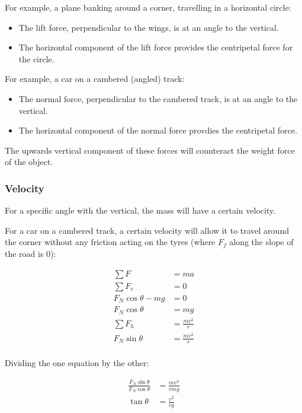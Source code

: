 \documentclass[a4paper,11pt]{article}
\begin{document}
For example, a plane banking around a corner, travelling in a horizontal circle:

\begin{itemize}
\item The lift force, perpendicular to the wings, is at an angle to the
	vertical.
\item The horizontal component of the lift force provides the centripetal force
	for the circle.
\end{itemize}

For example, a car on a cambered (angled) track:

\begin{itemize}
\item The normal force, perpendicular to the cambered track, is at an angle to
	the vertical.
\item The horizontal component of the normal force provdies the centripetal
	force.
\end{itemize}

The upwards vertical component of these forces will counteract the weight force
of the object.


\subsubsection{Velocity}

For a specific angle with the vertical, the mass will have a certain velocity.

For a car on a cambered track, a certain velocity will allow it to travel
around the corner without any friction acting on the tyres (where $F_f$ along
the slope of the road is 0):

$$
\begin{aligned}
\sum F & = ma \\
\sum F_v & = 0 \\
F_N \cos{\theta} - mg & = 0 \\
F_N \cos{\theta} & = mg \\
\sum F_h & = \frac{mv^2}{r} \\
F_N \sin{\theta} & = \frac{mv^2}{r} \\
\end{aligned}
$$

Dividing the one equation by the other:

$$
\begin{aligned}
\frac{F_N \sin{\theta}}{F_N \cos{\theta}} & = \frac{mv^2}{rmg} \\
\tan{\theta} & = \frac{v^2}{rg} \\
\end{aligned}
$$
\end{document}
